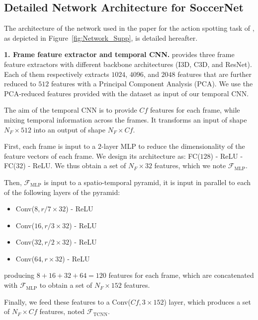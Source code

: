\documentclass[10pt,twocolumn,letterpaper]{article}
\begin{document}
\subsection{Detailed Network Architecture for SoccerNet}

The architecture of the network used in the paper for the action spotting task of \SoccerNet, as depicted in Figure~\ref{fig:Network_Supp}, is detailed hereafter.

\textbf{\color{Orange}1. 
Frame feature extractor and temporal CNN.}
\SoccerNet provides three frame feature extractors with different backbone architectures (I3D, C3D, and ResNet). 
Each of them respectively extracts $1024$, $4096$, and $2048$ features that are further reduced to $512$ features with a Principal Component Analysis (PCA).
We use the PCA-reduced features provided with the dataset as input of our temporal CNN.


The aim of the temporal CNN is to provide $Cf$ features for each frame, while mixing temporal information across the frames. It transforms an input of shape $N_F \times 512$ into an output of shape $N_F \times Cf$.

First, each frame is input to a $2$-layer MLP to reduce the dimensionality of the feature vectors of each frame. We design its architecture as: FC($128$) - ReLU - FC($32$) - ReLU. We thus obtain a set of $N_F\times 32$ features, which we note $\mathcal{F}_\text{MLP}$.

Then, $\mathcal{F}_\text{MLP}$ is input to a spatio-temporal pyramid, \ie it is input in parallel to each of the following layers of the pyramid:
\begin{itemize}
    \item Conv($8, r/7\times 32$) - ReLU
    \item Conv($16, r/3\times 32$) - ReLU
    \item Conv($32, r/2\times 32$) - ReLU
    \item Conv($64, r\times 32$) - ReLU
\end{itemize}
producing $8+16+32+64=120$ features for each frame, which are concatenated with $\mathcal{F}_\text{MLP}$ to obtain a set of $N_F\times 152$ features. 

Finally, we feed these features to a Conv($Cf, 3\times 152$) layer, which produces a set of $N_F\times Cf$ features, noted $\mathcal{F}_\text{TCNN}$.
\end{document}
